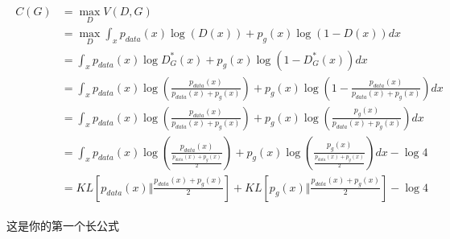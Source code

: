 \documentclass[a4paper, twoside]{ltxdoc}
\numberwithin{equation}{section} %
\begin{document}
{%
\begin{equation}\label{equ:1.2}
\begin{aligned}
\begin{split}
C(G) &= \max_D V(D,G) \\
&= \max_D \int_x p_{data}(x) \log{(D(x))} + p_g(x) \log{(1-D(x))} dx \\
&= \int_x p_{data}(x) \log{D_G^*(x)} + p_g(x) \log{(1-D_G^*(x))} dx \\
&= \int_x p_{data}(x) \log{(\frac{p_{data}(x)}{p_{data}(x)+p_g(x)})} + p_g(x) \log{(1-\frac{p_{data}(x)}{p_{data}(x)+p_g(x)})} dx \\
&= \int_x p_{data}(x) \log{(\frac{p_{data}(x)}{p_{data}(x)+p_g(x)})} + p_g(x) \log{(\frac{p_{g}(x)}{p_{data}(x)+p_g(x)})} dx \\
&= \int_x p_{data}(x) \log{(\frac{p_{data}(x)}{\frac{p_{data}(x)+p_g(x)}{2}})} + p_g(x) \log{(\frac{p_{g}(x)}{\frac{p_{data}(x)+p_g(x)}{2}})} dx - \log{4} \\
&= KL[p_{data}(x) \Vert \frac{p_{data}(x)+p_g(x)}{2}] + KL[p_g(x) \Vert \frac{p_{data}(x)+p_g(x)}{2}] - \log{4}
\end{split}
\end{aligned}
\end{equation}

这是你的第一个长公式

}
\end{document}
